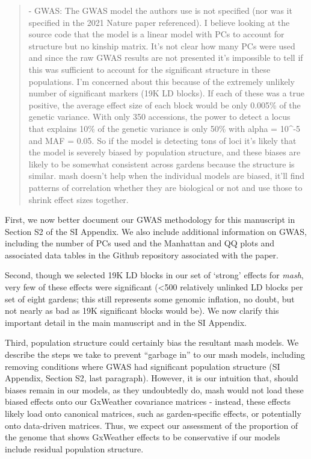 \documentclass[
  letterpaper,
  DIV=11,
  numbers=noendperiod]{scrartcl}
\begin{document}
\begin{quote}
\begin{tcolorbox}[enhanced jigsaw, colframe=quarto-callout-warning-color-frame, rightrule=.15mm, leftrule=.75mm, left=2mm, breakable, toprule=.15mm, arc=.35mm, bottomrule=.15mm, opacityback=0, colback=white]

- GWAS: The GWAS model the authors use is not specified (nor was it
specified in the 2021 Nature paper referenced). I believe looking at the
source code that the model is a linear model with PCs to account for
structure but no kinship matrix. It's not clear how many PCs were used
and since the raw GWAS results are not presented it's impossible to tell
if this was sufficient to account for the significant structure in these
populations. I'm concerned about this because of the extremely unlikely
number of significant markers (19K LD blocks). If each of these was a
true positive, the average effect size of each block would be only
0.005\% of the genetic variance. With only 350 accessions, the power to
detect a locus that explains 10\% of the genetic variance is only 50\%
with alpha = 10\^{}-5 and MAF = 0.05. So if the model is detecting tons
of loci it's likely that the model is severely biased by population
structure, and these biases are likely to be somewhat consistent across
gardens because the structure is similar. mash doesn't help when the
individual models are biased, it'll find patterns of correlation whether
they are biological or not and use those to shrink effect sizes
together.

\end{tcolorbox}
\end{quote}

First, we now better document our GWAS methodology for this manuscript
in Section S2 of the SI Appendix. We also include additional information
on GWAS, including the number of PCs used and the Manhattan and QQ plots
and associated data tables in the Github repository associated with the
paper.

Second, though we selected 19K LD blocks in our set of `strong' effects
for \emph{mash}, very few of these effects were significant
(\textless500 relatively unlinked LD blocks per set of eight gardens;
this still represents some genomic inflation, no doubt, but not nearly
as bad as 19K significant blocks would be). We now clarify this
important detail in the main manuscript and in the SI Appendix.

Third, population structure could certainly bias the resultant mash
models. We describe the steps we take to prevent ``garbage in'' to our
mash models, including removing conditions where GWAS had significant
population structure (SI Appendix, Section S2, last paragraph). However,
it is our intuition that, should biases remain in our models, as they
undoubtedly do, mash would not load these biased effects onto our
GxWeather covariance matrices - instead, these effects likely load onto
canonical matrices, such as garden-specific effects, or potentially onto
data-driven matrices. Thus, we expect our assessment of the proportion
of the genome that shows GxWeather effects to be conservative if our
models include residual population structure.
\end{document}
